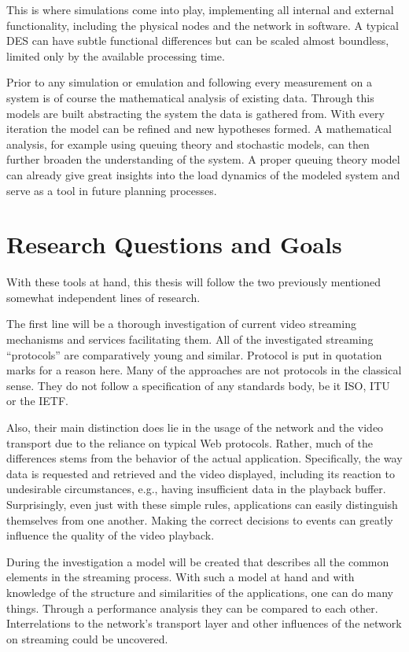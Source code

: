 This is where simulations come into play, implementing all internal and external functionality, including the physical nodes and the network in software. A typical \gls{DES} can have subtle functional differences but can be scaled almost boundless, limited only by the available processing time. 

Prior to any simulation or emulation and following every measurement on a system is of course the mathematical analysis of existing data. Through this models are built abstracting the system the data is gathered from. With every iteration the model can be refined and new hypotheses formed.
A mathematical analysis, for example using queuing theory and stochastic models, can then further broaden the understanding of the system. A proper queuing theory model can already give great insights into the load dynamics of the modeled system and serve as a tool in future planning processes.


\section{Research Questions and Goals}

With these tools at hand, this thesis will follow the two previously mentioned somewhat independent lines of research.

The first line will be a thorough investigation of current video streaming mechanisms and services facilitating them. All of the investigated streaming ``protocols'' are comparatively young and similar. Protocol is put in quotation marks for a reason here. Many of the approaches are not protocols in the classical sense. They do not follow a specification of any standards body, be it \gls{ISO}, \gls{ITU} or the \gls{IETF}. 

Also, their main distinction does lie in the usage of the network and the video transport due to the reliance on typical Web protocols. Rather, much of the differences stems from the behavior of the actual application. Specifically, the way data is requested and retrieved and the video displayed, including its reaction to undesirable circumstances, e.g., having insufficient data in the playback buffer. Surprisingly, even just with these simple rules, applications can easily distinguish themselves from one another. Making the correct decisions to events can greatly influence the quality of the video playback. 

During the investigation a model will be created that describes all the common elements in the streaming process. With such a model at hand and with knowledge of the structure and similarities of the applications, one can do many things. Through a performance analysis they can be compared to each other. Interrelations to the network's transport layer and other influences of the network on streaming could be uncovered. 

